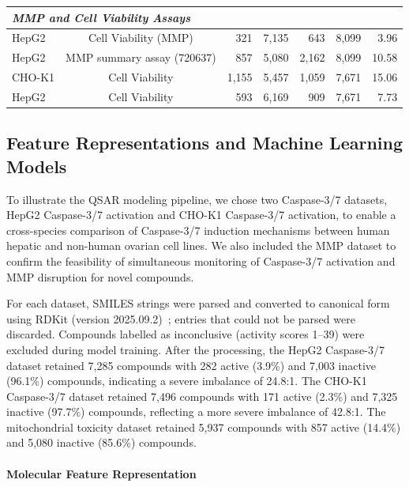 \documentclass[letterpaper]{article}
\begin{document}
\begin{table}[t]
\begin{tabular}{lcrrrrr}
\hline
\multicolumn{7}{l}{\textit{MMP and Cell Viability Assays}} \\
\hline
HepG2  & Cell Viability (MMP)        &   321   & 7{,}135 &   643   & 8{,}099 &  3.96 \\
HepG2  & MMP summary assay (720637) &   857   & 5{,}080 & 2{,}162 & 8{,}099 & 10.58 \\
CHO-K1 & Cell Viability             & 1{,}155 & 5{,}457 & 1{,}059 & 7{,}671 & 15.06 \\
HepG2  & Cell Viability             &   593   & 6{,}169 &   909   & 7{,}671 &  7.73 \\
\hline
\end{tabular}
\end{table}

\subsection{Feature Representations and Machine Learning Models}

To illustrate the QSAR modeling pipeline, we chose two Caspase-3/7 datasets, HepG2 Caspase-3/7 activation and CHO-K1 Caspase-3/7 activation, to enable a cross-species comparison of Caspase-3/7 induction mechanisms between human hepatic and non-human ovarian cell lines. We also included the MMP dataset to confirm the feasibility of simultaneous monitoring of Caspase-3/7 activation and MMP disruption for novel compounds.

For each dataset, SMILES strings were parsed and converted to canonical form using RDKit (version 2025.09.2)~\cite{landrum2006rdkit}; entries that could not be parsed were discarded. Compounds labelled as inconclusive (activity scores 1--39) were excluded during model training. After the processing, the HepG2 Caspase-3/7 dataset retained 7,285 compounds with 282 active (3.9\%) and 7,003 inactive (96.1\%) compounds, indicating a severe imbalance of 24.8:1. The CHO-K1 Caspase-3/7 dataset retained 7,496 compounds with 171 active (2.3\%) and 7,325 inactive (97.7\%) compounds, reflecting a more severe imbalance of 42.8:1. The mitochondrial toxicity dataset retained 5,937 compounds with 857 active (14.4\%) and 5,080 inactive (85.6\%) compounds.

\paragraph{Molecular Feature Representation}
\end{document}

